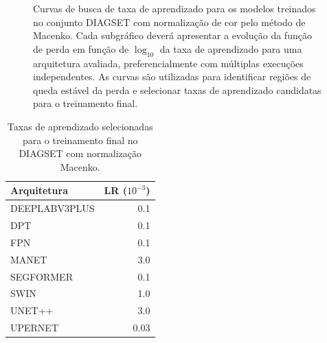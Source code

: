 \begin{figure}[!htb]
\centering


\caption[Curvas de busca de taxa de aprendizado para DIAGSET com Macenko]{
Curvas de busca de taxa de aprendizado para os modelos treinados no conjunto
DIAGSET com normalização de cor pelo método de Macenko. Cada subgráfico deverá
apresentar a evolução da função de perda em função de $\log_{10}$ da taxa de
aprendizado para uma arquitetura avaliada, preferencialmente com múltiplas
execuções independentes. As curvas são utilizadas para identificar regiões de
queda estável da perda e selecionar taxas de aprendizado candidatas para o
treinamento final.
}
\label{fig:results_diagset-lr-curves-macenko}
\end{figure}

\begin{table}[!htb]
\centering
\caption{Taxas de aprendizado selecionadas para o treinamento final no DIAGSET com normalização Macenko.}
\label{tab:results_diagset-learning-rates-macenko}
\begin{tabular}{lr}
\toprule
Arquitetura & LR ($10^{-3}$) \\
\midrule
DEEPLABV3PLUS & 0.1 \\
DPT & 0.1 \\
FPN & 0.1 \\
MANET & 3.0 \\
SEGFORMER & 0.1 \\
SWIN & 1.0 \\
UNET++ & 3.0 \\
UPERNET & 0.03 \\
\bottomrule
\end{tabular}
\end{table}
